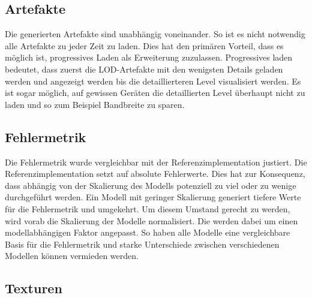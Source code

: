 
\subsection{Artefakte}

Die generierten Artefakte sind unabhängig voneinander. So ist es nicht notwendig alle Artefakte zu jeder Zeit zu laden. Dies hat den primären Vorteil, dass es möglich ist, progressives Laden als Erweiterung zuzulassen. Progressives laden bedeutet, dass zuerst die LOD-Artefakte mit den wenigsten Details geladen werden und angezeigt werden bis die detaillierteren Level visualisiert werden.
Es ist sogar möglich, auf gewissen Geräten die detaillierten Level überhaupt nicht zu laden und so zum Beispiel Bandbreite zu sparen.

\subsection{Fehlermetrik}

Die Fehlermetrik wurde vergleichbar mit der Referenzimplementation justiert. Die Referenzimplementation setzt auf absolute Fehlerwerte. Dies hat zur Konsequenz, dass abhängig von der Skalierung des Modells potenziell zu viel oder zu wenige  durchgeführt werden. Ein Modell mit geringer Skalierung generiert tiefere Werte für die Fehlermetrik und umgekehrt. Um diesem Umstand gerecht zu werden, wird vorab die Skalierung der Modelle normalisiert. Die  werden dabei um einen modellabhängigen Faktor angepasst. So haben alle Modelle eine vergleichbare Basis für die Fehlermetrik und starke Unterschiede zwischen verschiedenen Modellen können vermieden werden.

\subsection{Texturen}

